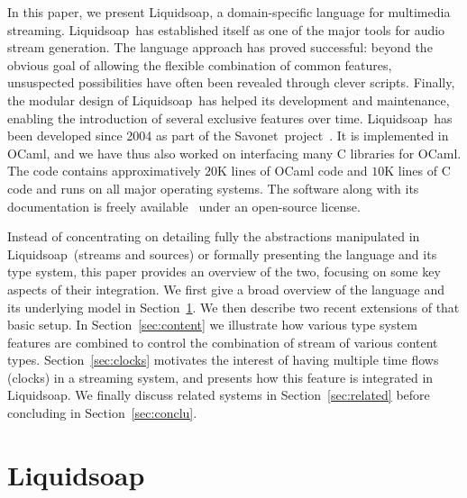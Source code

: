 \documentclass{llncs}
\newcommand{\liquidsoap}{Liquidsoap}
\newcommand{\savonet}{Savonet}
\begin{document}
In this paper, we present \liquidsoap, a domain-specific language for
multimedia streaming.
%
\liquidsoap\ has established itself as one of
the major tools for audio stream generation.
The language approach has proved successful:
beyond the obvious goal of allowing the flexible combination of
common features, unsuspected possibilities have often been revealed
through clever scripts.
Finally, the modular design of \liquidsoap\ has helped its development and
maintenance, enabling the introduction of several exclusive features
over time.
%
\liquidsoap\ has been developed since 2004
as part of the \savonet\ project~\cite{liquidsoap}.
It is implemented in OCaml,
and we have thus also worked on interfacing many C libraries for OCaml.
The code contains approximatively $20$K lines of OCaml code
and $10$K lines of C code and runs on all major operating systems.
The software along with its documentation is freely
available~\cite{liquidsoap} under an open-source license.
%

Instead of concentrating on detailing fully the abstractions
manipulated in \liquidsoap\ (streams and sources)
or formally presenting the language and its type system,
this paper provides an overview of the two, focusing on some
key aspects of their integration.
We first give a broad
overview of the language and its underlying model in
Section~\ref{sec:liq}.
We then describe two recent extensions of that basic setup.
In Section~\ref{sec:content} we illustrate how various type system
features are combined to control the combination of stream
of various content types.
Section~\ref{sec:clocks} motivates
the interest of having multiple time flows (clocks)
in a streaming system, and presents how this feature is
integrated in \liquidsoap.
We finally discuss related systems in Section~\ref{sec:related}
before concluding in Section~\ref{sec:conclu}.

\section{Liquidsoap}
\label{sec:liq}
\end{document}
